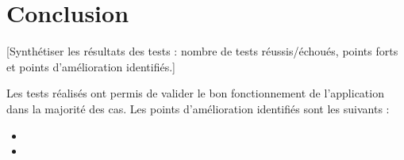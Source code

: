 \documentclass[12pt, a4paper]{article}
\begin{document}
\section{Conclusion}

[Synthétiser les résultats des tests : nombre de tests réussis/échoués,
points forts et points d'amélioration identifiés.]

Les tests réalisés ont permis de valider le bon fonctionnement de l'application
dans la majorité des cas. Les points d'amélioration identifiés sont les suivants :

\begin{itemize}
  \item [Point d'amélioration 1]
  \item [Point d'amélioration 2]
\end{itemize}
\end{document}
